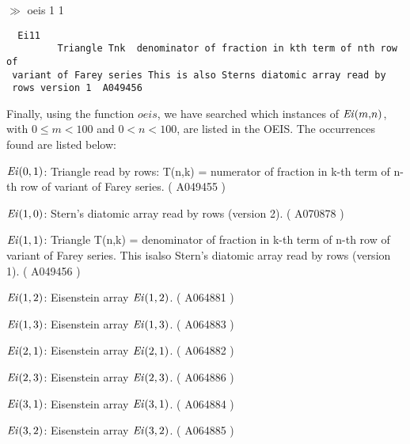 \documentclass[leqno,fleqn,12pt]{article}
\newcommand{\Varid}[1]{\mathit{#1}}
\renewcommand{\leq}{\leqslant}
\def\prompt#1{\noindent$\gg$ #1}
\begin{document}
\medskip
\prompt{oeis 1 1}
\noindent\begin{tabbing}\tt
~Ei11\\
\tt ~~~~~~~~~Triangle~Tnk~~denominator~of~fraction~in~kth~term~of~nth~row~of\\
\tt ~variant~of~Farey~series~This~is~also~Sterns~diatomic~array~read~by\\
\tt ~rows~version~1~~A049456~
\end{tabbing}

Finally, using the function \ensuremath{\Varid{oeis}}, we have searched which instances of $\mathit{Ei\/}(m{,}n)$, with $0{\leq}m{<}100$ and $0{<}n{<}100$, are listed in the OEIS.  The occurrences found are listed below:

\begin{description}
\item{$\mathit{Ei\/}(0,1)$:}
        Triangle read by rows: T(n,k) = numerator of fraction in k-th term of n-th row of variant of Farey series. ( A049455 )
\item{$\mathit{Ei\/}(1,0)$:}
        Stern's diatomic array read by rows (version 2). ( A070878 )
\item{$\mathit{Ei\/}(1,1)$:}
        Triangle T(n,k) = denominator of fraction in k-th term of n-th row of variant of Farey series. This isalso Stern's diatomic array read by rows (version 1). ( A049456 )
\item{$\mathit{Ei\/}(1,2)$:}
        Eisenstein array $\mathit{Ei\/}(1,2)$. ( A064881 )
\item{$\mathit{Ei\/}(1,3)$:}
        Eisenstein array $\mathit{Ei\/}(1,3)$. ( A064883 )
\item{$\mathit{Ei\/}(2,1)$:}
        Eisenstein array $\mathit{Ei\/}(2,1)$. ( A064882 )
\item{$\mathit{Ei\/}(2,3)$:}
        Eisenstein array $\mathit{Ei\/}(2,3)$. ( A064886 )
\item{$\mathit{Ei\/}(3,1)$:}
        Eisenstein array $\mathit{Ei\/}(3,1)$. ( A064884 )
\item{$\mathit{Ei\/}(3,2)$:}
        Eisenstein array $\mathit{Ei\/}(3,2)$. ( A064885 ) 
\end{description}





\end{document}
